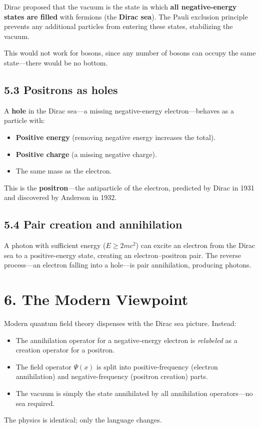 \documentclass[12pt,a4paper]{article}
\begin{document}
Dirac proposed that the vacuum is the state in which \textbf{all negative-energy states are filled} with fermions (the \textbf{Dirac sea}).  The Pauli exclusion principle prevents any additional particles from entering these states, stabilizing the vacuum.

This would not work for bosons, since any number of bosons can occupy the same state---there would be no bottom.

\subsection{5.3 Positrons as holes}

A \textbf{hole} in the Dirac sea---a missing negative-energy electron---behaves as a particle with:
\begin{itemize}[nosep]
    \item \textbf{Positive energy} (removing negative energy increases the total).
    \item \textbf{Positive charge} (a missing negative charge).
    \item The same mass as the electron.
\end{itemize}
This is the \textbf{positron}---the antiparticle of the electron, predicted by Dirac in 1931 and discovered by Anderson in 1932.

\subsection{5.4 Pair creation and annihilation}

A photon with sufficient energy ($E \geq 2mc^2$) can excite an electron from the Dirac sea to a positive-energy state, creating an electron--positron pair.  The reverse process---an electron falling into a hole---is pair annihilation, producing photons.

\section{6. The Modern Viewpoint}

Modern quantum field theory dispenses with the Dirac sea picture.  Instead:
\begin{itemize}[nosep]
    \item The annihilation operator for a negative-energy electron is \emph{relabeled} as a creation operator for a positron.
    \item The field operator $\Psi(x)$ is split into positive-frequency (electron annihilation) and negative-frequency (positron creation) parts.
    \item The vacuum is simply the state annihilated by all annihilation operators---no sea required.
\end{itemize}
The physics is identical; only the language changes.
\end{document}
